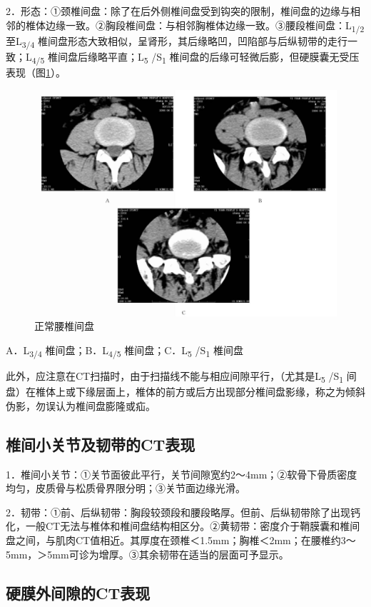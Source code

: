 2．形态：①颈椎间盘：除了在后外侧椎间盘受到钩突的限制，椎间盘的边缘与相邻的椎体边缘一致。②胸段椎间盘：与相邻胸椎体边缘一致。③腰段椎间盘：L\textsubscript{1/2}
至L\textsubscript{3/4}
椎间盘形态大致相似，呈肾形，其后缘略凹，凹陷部与后纵韧带的走行一致；L\textsubscript{4/5}
椎间盘后缘略平直；L\textsubscript{5} /S\textsubscript{1}
椎间盘的后缘可轻微后膨，但硬膜囊无受压表现（图\ref{fig23-1}）。

\begin{figure}[!htbp]
 \centering
 \includegraphics[width=.7\textwidth,height=\textheight,keepaspectratio]{./images/Image00464.jpg}
 \captionsetup{justification=centering}
 \caption{正常腰椎间盘}
 \label{fig23-1}
  \end{figure} 

A．L\textsubscript{3/4} 椎间盘；B．L\textsubscript{4/5}
椎间盘；C．L\textsubscript{5} /S\textsubscript{1} 椎间盘

此外，应注意在CT扫描时，由于扫描线不能与相应间隙平行，（尤其是L\textsubscript{5}
/S\textsubscript{1}
间盘）在椎体上或下缘层面上，椎体的前方或后方出现部分椎间盘影缘，称之为倾斜伪影，勿误认为椎间盘膨隆或疝。

\subsection{椎间小关节及韧带的CT表现}

1．椎间小关节：①关节面彼此平行，关节间隙宽约2～4mm；②软骨下骨质密度均匀，皮质骨与松质骨界限分明；③关节面边缘光滑。

2．韧带：①前、后纵韧带：胸段较颈段和腰段略厚。但前、后纵韧带除了出现钙化，一般CT无法与椎体和椎间盘结构相区分。②黄韧带：密度介于鞘膜囊和椎间盘之间，与肌肉CT值相近。其厚度在颈椎＜1.5mm；胸椎＜2mm；在腰椎约3～5mm，＞5mm可诊为增厚。③其余韧带在适当的层面可予显示。

\subsection{硬膜外间隙的CT表现}

